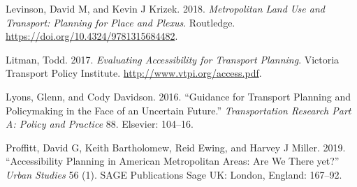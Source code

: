 \documentclass[12pt,]{article}
\begin{document}
\leavevmode\hypertarget{ref-levinson2018metropolitan}{}%
Levinson, David M, and Kevin J Krizek. 2018. \emph{Metropolitan Land Use
and Transport: Planning for Place and Plexus}. Routledge.
\url{https://doi.org/10.4324/9781315684482}.

\leavevmode\hypertarget{ref-litman2017evaluating}{}%
Litman, Todd. 2017. \emph{Evaluating Accessibility for Transport
Planning}. Victoria Transport Policy Institute.
\url{http://www.vtpi.org/access.pdf}.

\leavevmode\hypertarget{ref-lyons2016guidance}{}%
Lyons, Glenn, and Cody Davidson. 2016. ``Guidance for Transport Planning
and Policymaking in the Face of an Uncertain Future.''
\emph{Transportation Research Part A: Policy and Practice} 88. Elsevier:
104--16.

\leavevmode\hypertarget{ref-proffitt2019accessibility}{}%
Proffitt, David G, Keith Bartholomew, Reid Ewing, and Harvey J Miller.
2019. ``Accessibility Planning in American Metropolitan Areas: Are We
There yet?'' \emph{Urban Studies} 56 (1). SAGE Publications Sage UK:
London, England: 167--92.
\end{document}
